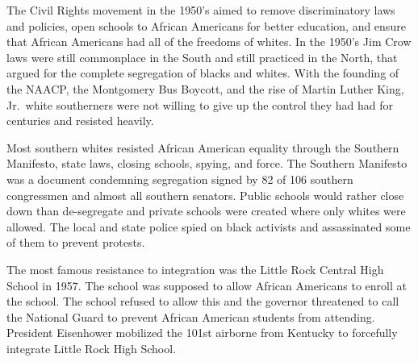The Civil Rights movement in the 1950's aimed to remove discriminatory laws and policies, open schools to African Americans for better education, and ensure that African Americans had all of the freedoms of whites.
In the 1950's Jim Crow laws were still commonplace in the South and still practiced in the North, that argued for the complete segregation of blacks and whites.
With the founding of the NAACP, the Montgomery Bus Boycott, and the rise of Martin Luther King, Jr.\ white southerners were not willing to give up the control they had had for centuries and resisted heavily.

Most southern whites resisted African American equality through the Southern Manifesto, state laws, closing schools, spying, and force.
The Southern Manifesto was a document condemning segregation signed by 82 of 106 southern congressmen and almost all southern senators.
Public schools would rather close down than de-segregate and private schools were created where only whites were allowed.
The local and state police spied on black activists and assassinated some of them to prevent protests.

The most famous resistance to integration was the Little Rock Central High School in 1957.
The school was supposed to allow African Americans to enroll at the school.
The school refused to allow this and the governor threatened to call the National Guard to prevent African American students from attending.
President Eisenhower mobilized the 101st airborne from Kentucky to forcefully integrate Little Rock High School.